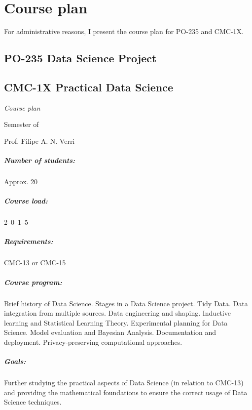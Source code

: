 \chapter*{Course plan}

For administrative reasons, I present the course plan for PO-235 and CMC-1X.

\newpage
\section*{PO-235 Data Science Project}

\newpage
\section*{CMC-1X Practical Data Science}

\emph{Course plan}

 Semester of \the\year{}

Prof. Filipe A. N. Verri

\paragraph{Number of students:} Approx. 20

\paragraph{Course load:} 2--0--1--5

\paragraph{Requirements:} CMC-13 or CMC-15

\paragraph{Course program:}
Brief history of Data Science. Stages in a Data Science project. Tidy Data. Data
integration from multiple sources. Data engineering and shaping. Inductive learning and
Statistical Learning Theory. Experimental planning for Data Science. Model evaluation and
Bayesian Analysis. Documentation and deployment. Privacy-preserving computational
approaches.

\paragraph{Goals:}
Further studying the practical aspects of Data Science (in relation to CMC-13) and providing
the mathematical foundations to ensure the correct usage of Data Science techniques.

